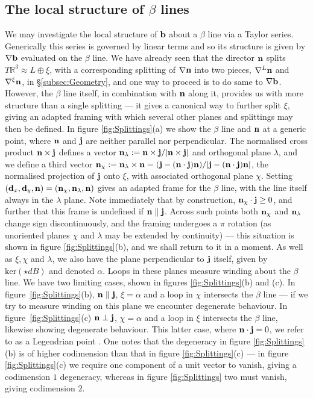 \subsection{The local structure of $\beta$ lines}
\label{subsec:BendLocalStructure}
We may investigate the local structure of $\mathbf{b}$ about a $\beta$ line via a Taylor series. Generically this series is governed by linear terms and so its structure is given by $\nabla \mathbf{b}$ evaluated on the $\beta$ line. We have already seen that the director $\mathbf{n}$ splits $T \mathbb{R}^3\approx L \oplus \xi$, with a corresponding splitting of $\nabla \mathbf{n}$ into two pieces, $\nabla^L \mathbf{n} $ and $\nabla^\xi \mathbf{n}$, in \S\ref{subsec:Geometry}, and one way to proceed is to do same to $\nabla \mathbf{b}$. However, the $\beta$ line itself, in combination with $\mathbf{n}$ along it, provides us with more structure than a single splitting --- it gives a canonical way to further split $\xi$, giving an adapted framing with which several other planes and splittings may then be defined. In figure \ref{fig:Splittings}(a) we show the $\beta$ line and $\mathbf{n}$ at a generic point, where $\mathbf{n}$ and $\mathbf{j}$ are neither parallel nor perpendicular. The normalised cross product $\mathbf{n} \times \mathbf{j}$ defines a vector $\mathbf{n}_\lambda := \mathbf{n} \times \mathbf{j}/| \mathbf{n} \times \mathbf{j}|$ and orthogonal plane $\lambda$, and we define a third vector $\mathbf{n}_\chi := \mathbf{n}_\lambda \times \mathbf{n} = (\mathbf{j} - (\mathbf{n}\cdot \mathbf{j})\mathbf{n})/|\mathbf{j} - (\mathbf{n}\cdot \mathbf{j})\mathbf{n}|$, the normalised projection of $\mathbf{j}$ onto $\xi$, with associated orthogonal plane $\chi$. Setting $(\mathbf{d}_x, \mathbf{d}_y, \mathbf{n}) = (\mathbf{n}_\chi, \mathbf{n}_\lambda, \mathbf{n})$ gives an adapted frame for the $\beta$ line, with the line itself always in the $\lambda$ plane. Note immediately that by construction, $\mathbf{n}_\chi \cdot \mathbf{j} \geq 0$, and further that this frame is undefined if $\mathbf{n} \parallel \mathbf{j}$. Across such points both $\mathbf{n}_\chi$ and $\mathbf{n}_\lambda$ change sign discontinuously, and the framing undergoes a $\pi$ rotation (as unoriented planes $\chi$ and $\lambda$ may be extended by continuity) --- this situation is shown in figure  \ref{fig:Splittings}(b), and we shall return to it in a moment. As well as $\xi, \chi$ and $\lambda$, we also have the plane perpendicular to $\mathbf{j}$ itself, given by $\mathrm{ker}(\star dB)$ and denoted $\alpha$. Loops in these planes measure winding about the $\beta$ line. We have two limiting cases, shown in figures \ref{fig:Splittings}(b) and (c). In figure~\ref{fig:Splittings}(b), $\mathbf{n} \parallel \mathbf{j}$, $\xi = \alpha$ and a loop in $\chi$ intersects the $\beta$ line --- if we try to measure winding on this plane we encounter degenerate behaviour. In figure~\ref{fig:Splittings}(c) $\mathbf{n} \perp \mathbf{j}$, $\chi = \alpha$ and a loop in $\xi$  intersects the $\beta$ line, likewise showing degenerate behaviour. This latter case, where $\mathbf{n} \cdot \mathbf{j}= 0$, we refer to as a Legendrian point \citep{Geiges2009}. One notes that the degeneracy in figure \ref{fig:Splittings}(b) is of higher codimension than that in figure \ref{fig:Splittings}(c) --- in figure \ref{fig:Splittings}(c) we require one component of a unit vector to vanish, giving a codimension $1$ degeneracy, whereas in figure \ref{fig:Splittings} two must vanish, giving codimension $2$.
